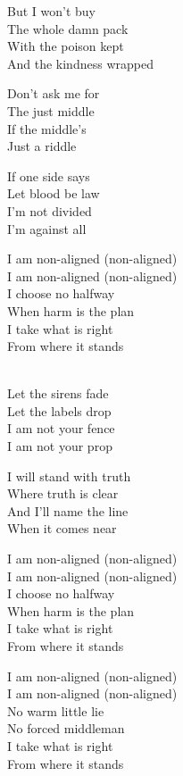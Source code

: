 \begin{lyrics}
But I won’t buy\\
The whole damn pack\\
With the poison kept\\
And the kindness wrapped

Don’t ask me for\\
The just middle\\
If the middle’s\\
Just a riddle

If one side says\\
Let blood be law\\
I’m not divided\\
I’m against all

I am non-aligned (non-aligned)\\
I am non-aligned (non-aligned)\\
I choose no halfway\\
When harm is the plan\\
I take what is right\\
From where it stands

\\
Let the sirens fade\\
Let the labels drop\\
I am not your fence\\
I am not your prop

I will stand with truth\\
Where truth is clear\\
And I’ll name the line\\
When it comes near

I am non-aligned (non-aligned)\\
I am non-aligned (non-aligned)\\
I choose no halfway\\
When harm is the plan\\
I take what is right\\
From where it stands

I am non-aligned (non-aligned)\\
I am non-aligned (non-aligned)\\
No warm little lie\\
No forced middleman\\
I take what is right\\
From where it stands
\end{lyrics}

